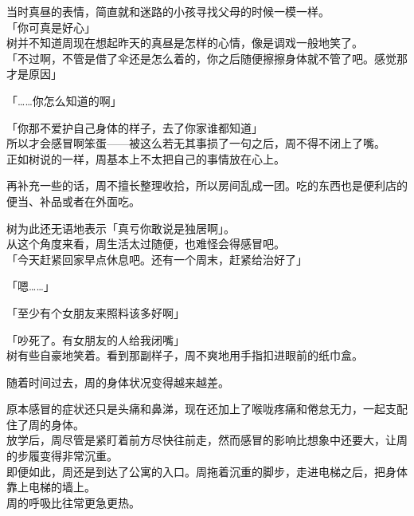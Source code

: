 当时真昼的表情，简直就和迷路的小孩寻找父母的时候一模一样。\\

「你可真是好心」\\

树并不知道周现在想起昨天的真昼是怎样的心情，像是调戏一般地笑了。\\

「不过啊，不管是借了伞还是怎么着的，你之后随便擦擦身体就不管了吧。感觉那才是原因」

「……你怎么知道的啊」

「你那不爱护自己身体的样子，去了你家谁都知道」\\

所以才会感冒啊笨蛋——被这么若无其事损了一句之后，周不得不闭上了嘴。\\

正如树说的一样，周基本上不太把自己的事情放在心上。

再补充一些的话，周不擅长整理收拾，所以房间乱成一团。吃的东西也是便利店的便当、补品或者在外面吃。

树为此还无语地表示「真亏你敢说是独居啊」。\\

从这个角度来看，周生活太过随便，也难怪会得感冒吧。\\

「今天赶紧回家早点休息吧。还有一个周末，赶紧给治好了」

「嗯……」

「至少有个女朋友来照料该多好啊」

「吵死了。有女朋友的人给我闭嘴」\\

树有些自豪地笑着。看到那副样子，周不爽地用手指扣进眼前的纸巾盒。\\

\vspace{2\baselineskip}

随着时间过去，周的身体状况变得越来越差。

原本感冒的症状还只是头痛和鼻涕，现在还加上了喉咙疼痛和倦怠无力，一起支配住了周的身体。\\

放学后，周尽管是紧盯着前方尽快往前走，然而感冒的影响比想象中还要大，让周的步履变得非常沉重。\\

即便如此，周还是到达了公寓的入口。周拖着沉重的脚步，走进电梯之后，把身体靠上电梯的墙上。\\

周的呼吸比往常更急更热。\\


